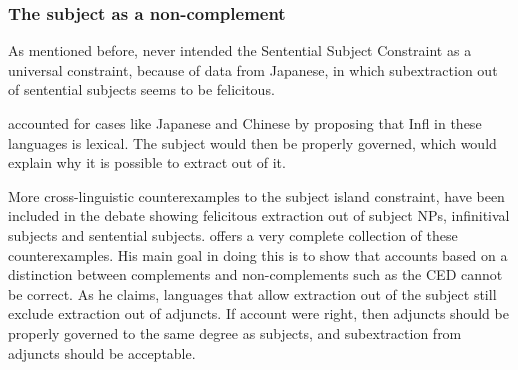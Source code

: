 \subsubsection{The subject as a non-complement}

As mentioned before, \citeauthor{Ross.1967} never intended the Sentential Subject Constraint as a universal constraint, because of data from Japanese, in which subextraction out of sentential subjects seems to be felicitous.

\z 
{}

\citet{Huang.1982} accounted for cases like Japanese and Chinese by proposing that Infl in these languages is lexical. The subject would then be properly governed, which would explain why it is possible to extract out of it.

More cross-linguistic counterexamples to the subject island constraint, have been included in the debate showing felicitous extraction out of subject NPs, infinitival subjects and sentential subjects. \citet{Stepanov.2007} offers a very complete collection of these counterexamples. His main goal in doing this is to show that accounts based on a distinction between complements and non-complements such as the CED cannot be correct. As he claims, languages that allow extraction out of the subject still exclude extraction out of adjuncts. If  account were right, then adjuncts should be properly governed to the same degree as subjects, and subextraction from adjuncts should be acceptable.

